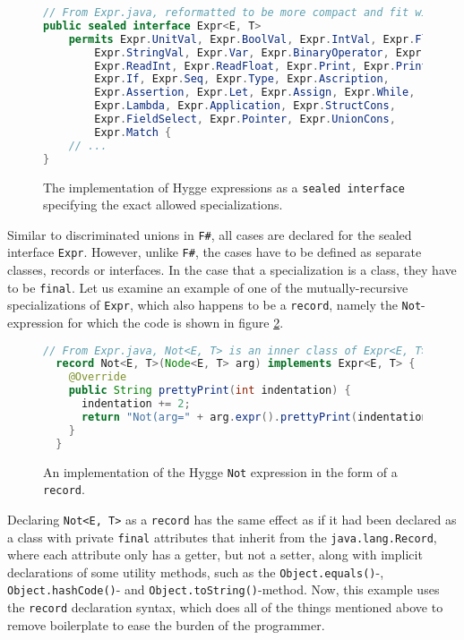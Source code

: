 \begin{figure}[H]
\centering 
\begin{lstlisting}[language=Java]
// From Expr.java, reformatted to be more compact and fit within the margins
public sealed interface Expr<E, T>
    permits Expr.UnitVal, Expr.BoolVal, Expr.IntVal, Expr.FloatVal,
        Expr.StringVal, Expr.Var, Expr.BinaryOperator, Expr.Not,
        Expr.ReadInt, Expr.ReadFloat, Expr.Print, Expr.PrintLn,
        Expr.If, Expr.Seq, Expr.Type, Expr.Ascription,
        Expr.Assertion, Expr.Let, Expr.Assign, Expr.While,
        Expr.Lambda, Expr.Application, Expr.StructCons,
        Expr.FieldSelect, Expr.Pointer, Expr.UnionCons,
        Expr.Match {
    // ...
}
\end{lstlisting}
\caption{The implementation of Hygge expressions as a \texttt{sealed interface} specifying the exact allowed specializations.}
\label{fig:expr_sealed_interface}
\end{figure}

Similar to discriminated unions in \texttt{F\#}, all cases are declared for the sealed interface \texttt{Expr}. However, unlike \texttt{F\#},
the cases have to be defined as separate classes, records or interfaces. In the case that a specialization is a class, they have to be \texttt{final}.
Let us examine an example of one of the mutually-recursive specializations of \texttt{Expr}, which also happens to be a \texttt{record}, namely the \texttt{Not}-expression for which the code is shown in figure \ref{fig:not_record}.

\begin{figure}[H]
\centering
\begin{lstlisting}[language=Java]
  // From Expr.java, Not<E, T> is an inner class of Expr<E, T>
  record Not<E, T>(Node<E, T> arg) implements Expr<E, T> {
    @Override
    public String prettyPrint(int indentation) {
      indentation += 2;
      return "Not(arg=" + arg.expr().prettyPrint(indentation) + ")";
    }
  }
\end{lstlisting}
\caption{An implementation of the Hygge \texttt{Not} expression in the form of a \texttt{record}.}
\label{fig:not_record}
\end{figure}

Declaring \texttt{Not<E, T>} as a \texttt{record} has the same effect as if it had been declared as a class with private \texttt{final}
attributes that inherit from the \texttt{java.lang.Record}, where each attribute only has a getter, but not a setter, along with implicit declarations
of some utility methods, such as the \texttt{Object.equals()}-, \texttt{Object.hashCode()}- and \texttt{Object.toString()}-method. Now, this example uses the
\texttt{record} declaration syntax, which does all of the things mentioned above to remove boilerplate to ease the burden of the programmer.

